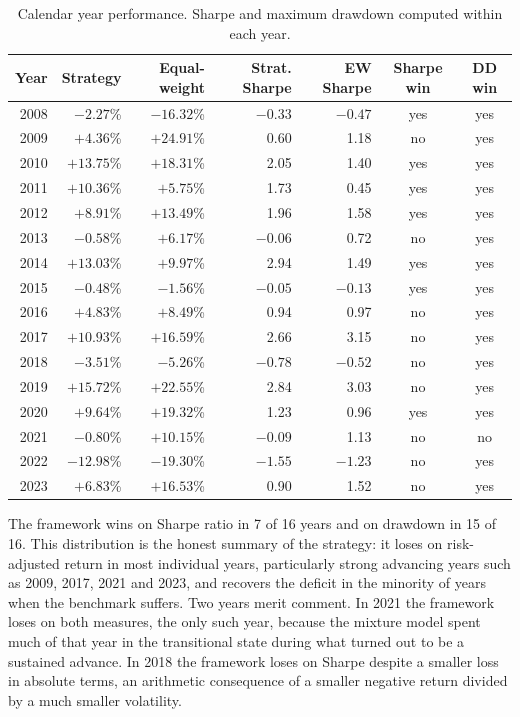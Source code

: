 \documentclass{singlecol-new}
\theoremstyle{TH}{
\newtheorem{lemma}{Lemma}
\newtheorem{theorem}[lemma]{Theorem}
\newtheorem{corrolary}[lemma]{Corrolary}
\newtheorem{conjecture}[lemma]{Conjecture}
\newtheorem{proposition}[lemma]{Proposition}
\newtheorem{claim}[lemma]{Claim}
\newtheorem{stheorem}[lemma]{Wrong Theorem}
\newtheorem{algorithm}{Algorithm}
}
\theoremstyle{THrm}{
\newtheorem{definition}{Definition}[section]
\newtheorem{question}{Question}[section]
\newtheorem{remark}{Remark}
\newtheorem{scheme}{Scheme}
}
\theoremstyle{THhit}{
\newtheorem{case}{Case}[section]
}
\begin{document}
\begin{table}[!ht]
\centering
\caption{Calendar year performance. Sharpe and maximum drawdown computed within each year.}
\label{tab:years}
\small
\begin{tabular}{rrrrrcc}
\hline
\textbf{Year} & \textbf{Strategy} & \textbf{Equal-weight} & \textbf{Strat. Sharpe} & \textbf{EW Sharpe} & \textbf{Sharpe win} & \textbf{DD win} \\
\hline
2008 & $-2.27$\% & $-16.32$\% & $-0.33$ & $-0.47$ & yes & yes \\
2009 & $+4.36$\% & $+24.91$\% & 0.60 & 1.18 & no & yes \\
2010 & $+13.75$\% & $+18.31$\% & 2.05 & 1.40 & yes & yes \\
2011 & $+10.36$\% & $+5.75$\% & 1.73 & 0.45 & yes & yes \\
2012 & $+8.91$\% & $+13.49$\% & 1.96 & 1.58 & yes & yes \\
2013 & $-0.58$\% & $+6.17$\% & $-0.06$ & 0.72 & no & yes \\
2014 & $+13.03$\% & $+9.97$\% & 2.94 & 1.49 & yes & yes \\
2015 & $-0.48$\% & $-1.56$\% & $-0.05$ & $-0.13$ & yes & yes \\
2016 & $+4.83$\% & $+8.49$\% & 0.94 & 0.97 & no & yes \\
2017 & $+10.93$\% & $+16.59$\% & 2.66 & 3.15 & no & yes \\
2018 & $-3.51$\% & $-5.26$\% & $-0.78$ & $-0.52$ & no & yes \\
2019 & $+15.72$\% & $+22.55$\% & 2.84 & 3.03 & no & yes \\
2020 & $+9.64$\% & $+19.32$\% & 1.23 & 0.96 & yes & yes \\
2021 & $-0.80$\% & $+10.15$\% & $-0.09$ & 1.13 & no & no \\
2022 & $-12.98$\% & $-19.30$\% & $-1.55$ & $-1.23$ & no & yes \\
2023 & $+6.83$\% & $+16.53$\% & 0.90 & 1.52 & no & yes \\
\hline
\end{tabular}
\end{table}

The framework wins on Sharpe ratio in 7 of 16 years and on drawdown in 15 of 16. This
distribution is the honest summary of the strategy: it loses on risk-adjusted return in
most individual years, particularly strong advancing years such as 2009, 2017, 2021 and
2023, and recovers the deficit in the minority of years when the benchmark suffers. Two
years merit comment. In 2021 the framework loses on both measures, the only such year,
because the mixture model spent much of that year in the transitional state during what
turned out to be a sustained advance. In 2018 the framework loses on Sharpe despite a
smaller loss in absolute terms, an arithmetic consequence of a smaller negative return
divided by a much smaller volatility.
\end{document}
